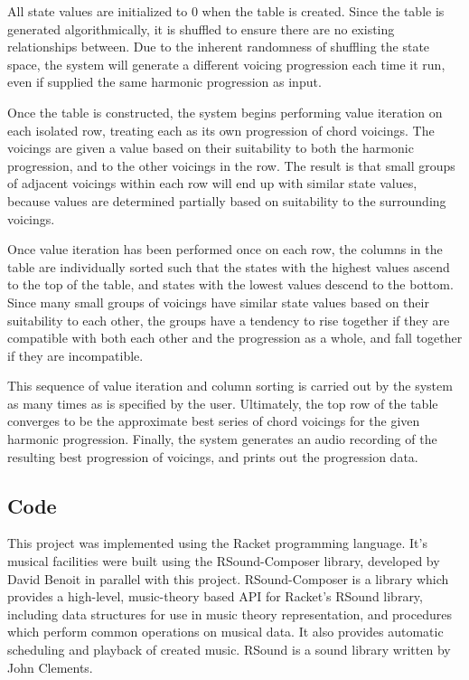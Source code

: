 \documentclass{chi2009}
\begin{document}
All state values are initialized to 0 when the table is created.  Since the table is generated algorithmically, it is shuffled to ensure there are no existing relationships between.  Due to the inherent randomness of shuffling the state space, the system will generate a different voicing progression each time it run, even if supplied the same harmonic progression as input.  

Once the table is constructed, the system begins performing value iteration on each isolated row, treating each as its own progression of chord voicings.  The voicings are given a value based on their suitability to both the harmonic progression, and to the other voicings in the row.  The result is that small groups of adjacent voicings within each row will end up with similar state values, because values are determined partially based on suitability to the surrounding voicings.

Once value iteration has been performed once on each row, the columns in the table are individually sorted such that the states with the highest values ascend to the top of the table, and states with the lowest values descend to the bottom.  Since many small groups of voicings have similar state values based on their suitability to each other, the groups have a tendency to rise together if they are compatible with both each other and the progression as a whole, and fall together if they are incompatible.  

This sequence of value iteration and column sorting is carried out by the system as many times as is specified by the user.  Ultimately, the top row of the table converges to be the approximate best series of chord voicings for the given harmonic progression.  Finally, the system generates an audio recording of the resulting best progression of voicings, and prints out the progression data.  

\subsection{Code}
This project was implemented using the Racket programming language.  It's musical facilities were built using the RSound-Composer library, developed by David Benoit in parallel with this project.  RSound-Composer is a library which provides a high-level, music-theory based API for Racket's RSound library, including data structures for use in music theory representation, and procedures which perform common operations on musical data.  It also provides automatic scheduling and playback of created music.  RSound is a sound library written by John Clements.
\end{document}
